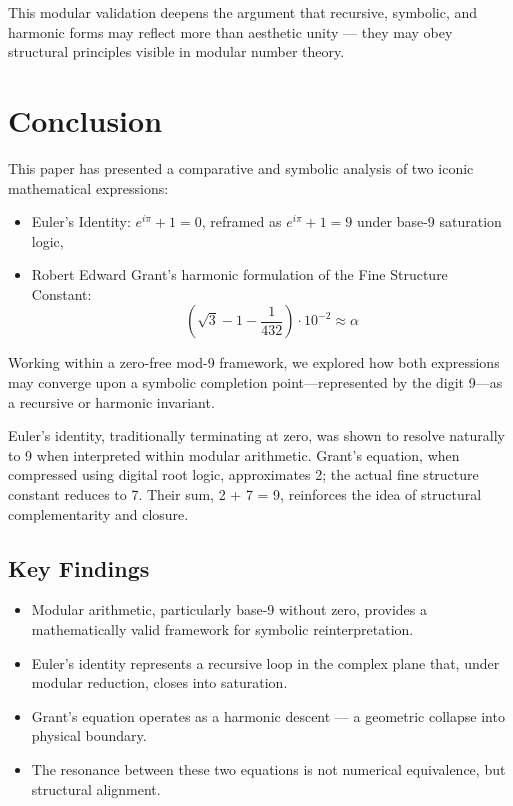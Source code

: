 \documentclass[12pt]{article}
\begin{document}
This modular validation deepens the argument that recursive, symbolic, and harmonic forms may reflect more than aesthetic unity — they may obey structural principles visible in modular number theory.

\newpage
\section{Conclusion}

This paper has presented a comparative and symbolic analysis of two iconic mathematical expressions:

\begin{itemize}[leftmargin=1.5em]
    \item Euler’s Identity: \( e^{i\pi} + 1 = 0 \), reframed as \( e^{i\pi} + 1 = 9 \) under base-9 saturation logic,
    \item Robert Edward Grant’s harmonic formulation of the Fine Structure Constant:
    \[
    \left( \sqrt{3} - 1 - \frac{1}{432} \right) \cdot 10^{-2} \approx \alpha
    \]
\end{itemize}

Working within a zero-free mod-9 framework, we explored how both expressions may converge upon a symbolic completion point—represented by the digit 9—as a recursive or harmonic invariant. 

Euler’s identity, traditionally terminating at zero, was shown to resolve naturally to 9 when interpreted within modular arithmetic. Grant’s equation, when compressed using digital root logic, approximates 2; the actual fine structure constant reduces to 7. Their sum, 2 + 7 = 9, reinforces the idea of structural complementarity and closure.

\subsection*{Key Findings}

\begin{itemize}[leftmargin=1.5em]
    \item Modular arithmetic, particularly base-9 without zero, provides a mathematically valid framework for symbolic reinterpretation.
    \item Euler’s identity represents a recursive loop in the complex plane that, under modular reduction, closes into saturation.
    \item Grant’s equation operates as a harmonic descent — a geometric collapse into physical boundary.
    \item The resonance between these two equations is not numerical equivalence, but structural alignment.
\end{itemize}
\end{document}

